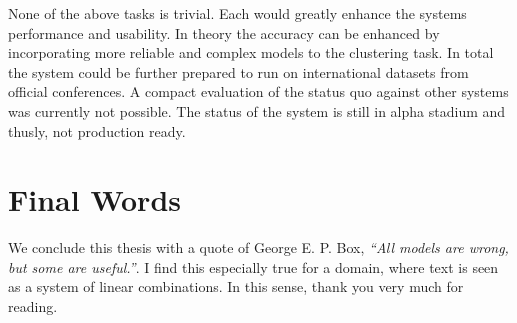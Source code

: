 None of the above tasks is trivial. Each would greatly enhance the systems performance and usability. In theory the accuracy can be enhanced by incorporating more reliable and complex models to the clustering task. In total the system could be further prepared to run on international datasets from official conferences. A compact evaluation of the status quo against other systems was currently not possible. The status of the system is still in alpha stadium and thusly, not production ready.

\section{Final Words}

We conclude this thesis with a quote of George E. P. Box, \emph{``All models are wrong, but some are useful.''}. I find this especially true for a domain, where text is seen as a system of linear combinations. In this sense, thank you very much for reading.

